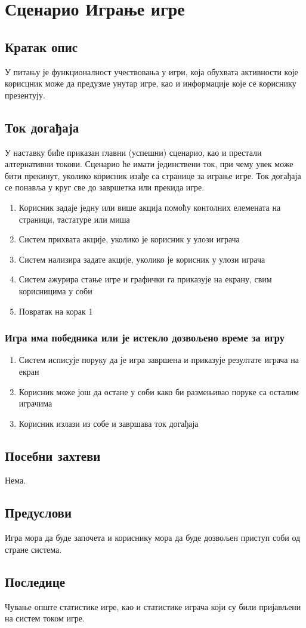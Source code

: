 \section{Сценарио Играње игре}

\subsection{Кратак опис}
У питању је функционалност учествовања у игри, која обухвата активности које корисцник може да предузме унутар игре, као и информације које се кориснику презентују.

\subsection{Ток догађаја}
У наставку биће приказан главни (успешни) сценарио, као и престали алтернативни токови. Сценарио ће имати јединствени ток, при чему увек може бити прекинут, уколико корисник изађе са странице за играње игре. Ток догађаја се понавља у круг све до завршетка или прекида игре.

\begin{enumerate}
    \item Корисник задаје једну или више акција помоћу контолних елемената на страници,
          тастатуре или миша
    \item Систем прихвата акције, уколико је корисник у улози играча
    \item Систем нализира задате акције, уколико је корисник у улози играча
    \item Систем ажурира стање игре и графички га приказује на екрану, свим корисницима
          у соби
    \item Повратак на корак 1
\end{enumerate}


\subsubsection{Игра има победника или је истекло дозвољено време за игру}
\begin{enumerate}[label=5.\arabic*]
	\item Систем исписује поруку да је игра завршена и приказује резултате играча на
	      екран
	\item Корисник може још да остане у соби како би размењивао поруке са осталим
	      играчима
	\item Корисник излази из собе и завршава ток догађаја
\end{enumerate}

\subsection{Посебни захтеви}
Нема.

\subsection{Предуслови}
Игра мора да буде започета и кориснику мора да буде дозвољен приступ соби од стране система.

\subsection{Последице}
Чување опште статистике игре, као и статистике играча који су били пријављени на систем током игре.
